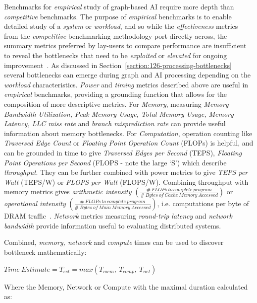 Benchmarks for \textit{empirical} study of graph-based AI require more depth than \textit{competitive} benchmarks.
The purpose of \textit{empirical} benchmarks is to enable detailed study of a \textit{system} or \textit{workload}, and so while the \textit{effectiveness} metrics from the \textit{competitive} benchmarking methodology port directly across, the summary metrics preferred by lay-users to compare performance are insufficient to reveal the bottlenecks that need to be \textit{exploited} or \textit{elevated} for ongoing improvement~\cite{Saavedra1996, Hooker1994, Hooker1995}.
As discussed in Section~\ref{section:126-processing-bottlenecks} several bottlenecks can emerge during graph and AI processing depending on the \textit{workload} characteristics. 
\textit{Power} and \textit{timing} metrics described above are useful in \textit{empirical} benchmarks, providing a grounding function that allows for the composition of more descriptive metrics. 
For \textit{Memory}, measuring \textit{Memory Bandwidth Utilization, Peak Memory Usage, Total Memory Usage, Memory Latency, LLC miss rate} and \textit{branch misprediction rate} can provide useful information about memory bottlenecks. 
For \textit{Computation}, operation counting like \textit{Traversed Edge Count} or \textit{Floating Point Operation Count} (FLOPs) is helpful, and can be grounded in time to give \textit{Traversed Edges per Second} (TEPS), \textit{Floating Point Operations per Second} (FLOPS - note the large `S') which describe \textit{throughput}. 
They can be further combined with power metrics to give \textit{TEPS per Watt} (TEPS/W) or \textit{FLOPS per Watt} (FLOPS/W).
Combining throughput with memory metrics gives \textit{arithmetic intensity} $\left(\frac{\#~FLOPs~to~complete~program}{\#~Bytes~of~Cache~Memory~Accessed}\right)$ or \textit{operational intensity} $\left(\frac{\#~FLOPs~to~complete~program}{\#~Bytes~of~Main~Memory~Accessed}\right)$, i.e. computations per byte of DRAM traffic~\cite{Williams2009}. 
\textit{Network} metrics measuring \textit{round-trip latency} and \textit{network bandwidth} provide information useful to evaluating distributed systems. 

Combined, \textit{memory, network} and \textit{compute} times can be used to discover bottleneck mathematically:

 $Time~Estimate=T_{est}=max\left(T_{mem},~T_{comp},~T_{net}\right)$

\noindent Where the Memory, Network or Compute with the maximal duration calculated as:


